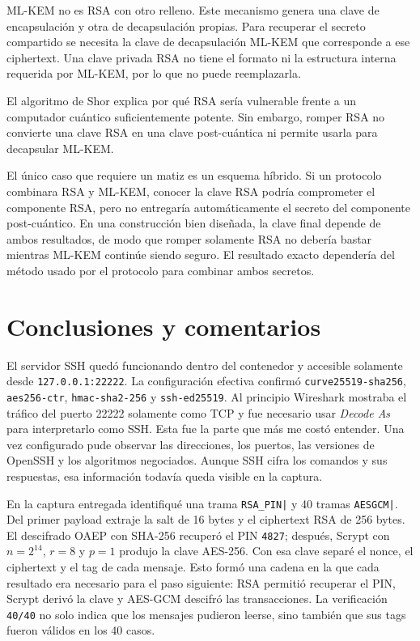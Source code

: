 \documentclass[letter,12pt]{article}
\begin{document}
    ML-KEM no es RSA con otro relleno. Este mecanismo genera una clave de encapsulación
    y otra de decapsulación propias. Para recuperar el secreto compartido se necesita la
    clave de decapsulación ML-KEM que corresponde a ese ciphertext. Una clave privada
    RSA no tiene el formato ni la estructura interna requerida por ML-KEM, por lo que no
    puede reemplazarla.

    El algoritmo de Shor explica por qué RSA sería vulnerable frente a un computador
    cuántico suficientemente potente. Sin embargo, romper RSA no convierte una clave RSA
    en una clave post-cuántica ni permite usarla para decapsular ML-KEM.

    El único caso que requiere un matiz es un esquema híbrido. Si un protocolo combinara
    RSA y ML-KEM, conocer la clave RSA podría comprometer el componente RSA, pero no
    entregaría automáticamente el secreto del componente post-cuántico. En una
    construcción bien diseñada, la clave final depende de ambos resultados, de modo que
    romper solamente RSA no debería bastar mientras ML-KEM continúe siendo seguro. El
    resultado exacto dependería del método usado por el protocolo para combinar ambos
    secretos.

\section*{Conclusiones y comentarios}

El servidor SSH quedó funcionando dentro del contenedor y accesible solamente desde
\texttt{127.0.0.1:22222}. La configuración efectiva confirmó
\texttt{curve25519-sha256}, \texttt{aes256-ctr}, \texttt{hmac-sha2-256} y
\texttt{ssh-ed25519}. Al principio Wireshark mostraba el tráfico del puerto 22222 solamente
como TCP y fue necesario usar \textit{Decode As} para interpretarlo como SSH. Esta fue la
parte que más me costó entender. Una vez configurado pude observar las direcciones, los
puertos, las versiones de OpenSSH y los algoritmos negociados. Aunque SSH cifra los comandos
y sus respuestas, esa información todavía queda visible en la captura.

En la captura entregada identifiqué una trama \texttt{RSA\_PIN|} y 40 tramas
\texttt{AESGCM|}. Del primer payload extraje la salt de 16 bytes y el ciphertext RSA de
256 bytes. El descifrado OAEP con SHA-256 recuperó el PIN \texttt{4827}; después, Scrypt
con $n=2^{14}$, $r=8$ y $p=1$ produjo la clave AES-256. Con esa clave separé el nonce, el
ciphertext y el tag de cada mensaje. Esto formó una cadena en la que cada resultado era
necesario para el paso siguiente: RSA permitió recuperar el PIN, Scrypt derivó la clave y
AES-GCM descifró las transacciones. La verificación \texttt{40/40} no solo indica que los
mensajes pudieron leerse, sino también que sus tags fueron válidos en los 40 casos.
\end{document}
